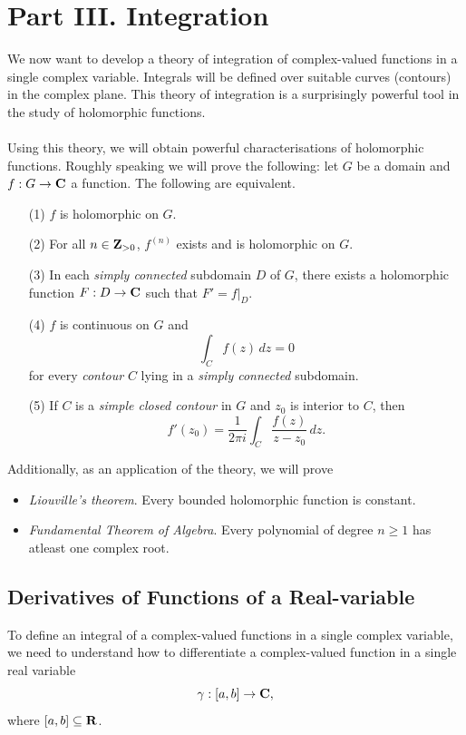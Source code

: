 \section{Part III. Integration}
%
We now want to develop a theory of integration of complex-valued functions in a single complex variable. Integrals will be defined over suitable curves (contours) in the complex plane. This theory of integration is a surprisingly powerful tool in the study of holomorphic functions.\\
\\
Using this theory, we will obtain powerful characterisations of holomorphic functions. Roughly speaking we will prove the following: let $G$ be a domain and $f:G \to \mathbf C$ a function. The following are equivalent. 
\begin{itemize}
\item[(1)] $f$ is holomorphic on $G$.
\item[(2)] For all $n \in \mathbf Z_{>0}$, $f^{(n)}$ exists and is holomorphic on $G$.
\item[(3)] In each \emph{simply connected} subdomain $D$ of $G$, there exists a holomorphic function $F:D \to \mathbf C$ such that $F' = f\vert_D$. 
\item[(4)] $f$ is continuous on $G$ and 
\[\int_C f(z)\,dz = 0\]
for every \emph{contour} $C$ lying in a \emph{simply connected} subdomain.
\item[(5)] If $C$ is a \emph{simple closed contour} in $G$ and $z_0$ is interior to $C$, then
\[f'(z_0) = \frac{1}{2\pi i}\int_C \frac{f(z)}{z - z_0}\,dz.\]
\end{itemize}
Additionally, as an application of the theory, we will prove
\begin{itemize}
\item \emph{Liouville's theorem}. Every bounded holomorphic function is constant.
\item \emph{Fundamental Theorem of Algebra}. Every polynomial of degree $n \geq 1$ has atleast one complex root.
\end{itemize}

\medskip

\subsection{Derivatives of Functions of a Real-variable}
To define an integral of a complex-valued functions in a single complex variable, we need to understand how to differentiate a complex-valued function in a single real variable
\[\gamma: [a,b] \to \mathbf C,\]
where $[a,b] \subseteq \mathbf R$.

